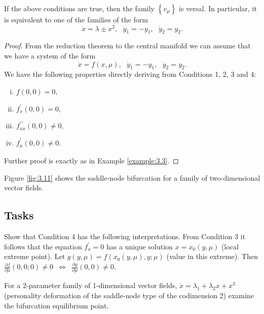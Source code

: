 \begin{theorem}
	If the above conditions are true, then the family $\left\{ v_{\mu }\right\} $ is versal. In particular, it is equivalent to one of the families of the form
	$$
	\dot{x}=\lambda \pm x^{2},\text{ \ \ }\dot{y}_{1}=-y_{1},\text{ \ \ } \dot{y}_{2}=y_{2}.
	$$
	
	\begin{proof}
		From the reduction theorem to the central manifold we can assume that we have a system of the form
		$$
		\dot{x}=f(x,\mu ),\text{ \ \ }\dot{y}_{1}=-y_{1},\text{ \ \ }\dot{y}_{2} = y_{2}.
		$$
		We have the following properties directly deriving from Conditions 1, 2, 3 and 4:
		\begin{enumerate}[(i)]
			\item $f(0,0)=0,$
			\item $f_{x}^{\prime }(0,0)=0,$
			\item $f_{xx}^{\prime \prime }(0,0)\not=0,$
			\item $f_{\mu }^{\prime }(0,0)\not=0.$
		\end{enumerate}
	Further proof is exactly as in Example \ref{example:3.3}.
	\end{proof}
\end{theorem}

Figure \ref{fig:3.11} shows the saddle-node bifurcation for a family of two-dimensional vector fields.

\subsection*{Tasks}
\begin{task}
	Show that Condition 4 has the following interpretations. From Condition 3 it follows that the equation $f_{x}^{\prime }=0$ has a unique solution $x=x_{0}(y,\mu )$ (local extreme point). Let $g(y,\mu )=f(x_{0}(y,\mu ),y;\mu )$ (value in this extreme). Then $\frac{\partial f}{\partial \mu }%
	(0,0;0)\not=0$\ $\Longleftrightarrow $\ $\frac{\partial g}{\partial \mu }%
	(0,0)\not=0.$
\end{task}

\begin{task}
	For a 2-parameter family of 1-dimensional vector fields, $\dot{x}=\lambda _{1}+\lambda _{2}x+x^{3}$ (personality deformation of the saddle-node type of the codimension 2) examine the bifurcation equilibrium point.
\end{task}

